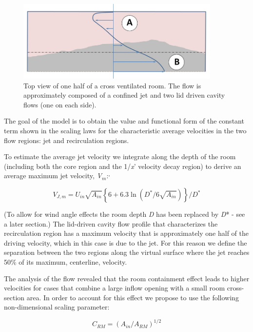 \begin{figure}[hbtp] %
\centering
\includegraphics[width=0.9\textwidth, height=0.9\textheight, keepaspectratio=true]{media/image2624.png}
\caption{Top view of one half of a cross ventilated room. The flow is approximately composed of a confined jet and two lid driven cavity flows (one on each side). \protect \label{fig:top-view-of-one-half-of-a-cross-ventilated}}
\end{figure}

The goal of the model is to obtain the value and functional form of the constant term shown in the scaling laws for the characteristic average velocities in the two flow regions: jet and recirculation regions.

To estimate the average jet velocity we integrate along the depth of the room (including both the core region and the 1/\emph{x}' velocity decay region) to derive an average maximum jet velocity, \emph{V}\(_{m}\):∙

\begin{equation}
{V_{J,m}} = {U_{in}}\sqrt {{A_{in}}} \left\{ {6 + 6.3\ln \left( {{D^*}/6\sqrt {{A_{in}}} } \right)} \right\}/{D^*}
\end{equation}

(To allow for wind angle effects the room depth \emph{D} has been replaced by \emph{D}* - see a later section.) The lid-driven cavity flow profile that characterizes the recirculation region has a maximum velocity that is approximately one half of the driving velocity, which in this case is due to the jet. For this reason we define the separation between the two regions along the virtual surface where the jet reaches 50\% of its maximum, centerline, velocity.

The analysis of the flow revealed that the room containment effect leads to higher velocities for cases that combine a large inflow opening with a small room cross-section area. In order to account for this effect we propose to use the following non-dimensional scaling parameter:

\begin{equation}
{C_{RM}} = {\left( {{A_{in}}/{A_{RM}}} \right)^{1/2}}
\end{equation}

